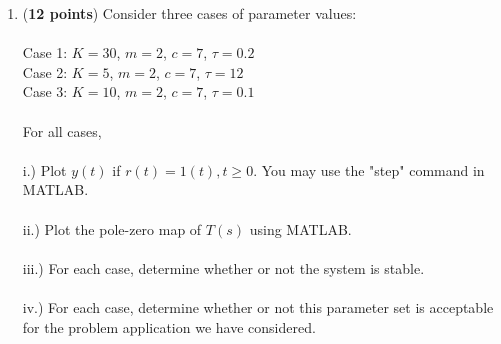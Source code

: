 \documentclass[]{article}
\begin{document}
\begin{enumerate}
\begin{enumerate}
        \item (\textbf{12 points}) Consider three cases of parameter values:\\\\
        Case 1: $K = 30$, $m = 2$, $c = 7$, $\tau = 0.2$\\
        Case 2: $K = 5$, $m = 2$, $c = 7$, $\tau = 12$\\
        Case 3: $K = 10$, $m = 2$, $c = 7$, $\tau = 0.1$\\\\
        For all cases,\\\\
        i.) Plot $y(t)$ if $r(t) = 1(t), t \geq 0$. You may use the "step" command in MATLAB.\\\\
        ii.) Plot the pole-zero map of $T(s)$ using MATLAB.\\\\
        iii.) For each case, determine whether or not the system is stable.\\\\
        iv.) For each case, determine whether or not this parameter set is acceptable for the problem application we have considered.
        \textcolor{blue}{
        }
        
    \end{enumerate}

\end{enumerate}
\end{document}
